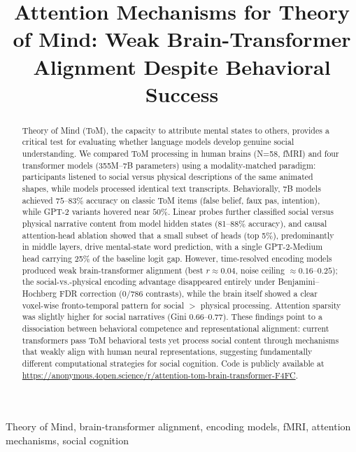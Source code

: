 \documentclass[conference]{IEEEtran}
\begin{document}
\title{Attention Mechanisms for Theory of Mind: Weak Brain-Transformer Alignment Despite Behavioral Success}

\author{
}

\maketitle

\begin{abstract}
Theory of Mind (ToM), the capacity to attribute mental states to others, provides a critical test for evaluating whether language models develop genuine social understanding. We compared ToM processing in human brains (N=58, fMRI) and four transformer models (355M--7B parameters) using a modality-matched paradigm: participants listened to social versus physical descriptions of the same animated shapes, while models processed identical text transcripts. Behaviorally, 7B models achieved $75$--$83\%$ accuracy on classic ToM items (false belief, faux pas, intention), while GPT-2 variants hovered near $50\%$. Linear probes further classified social versus physical narrative content from model hidden states (81--88\% accuracy), and causal attention-head ablation showed that a small subset of heads (top 5\%), predominantly in middle layers, drive mental-state word prediction, with a single GPT-2-Medium head carrying 25\% of the baseline logit gap. However, time-resolved encoding models produced weak brain-transformer alignment (best $r \approx 0.04$, noise ceiling $\approx 0.16$--$0.25$); the social-vs.-physical encoding advantage disappeared entirely under Benjamini--Hochberg FDR correction ($0/786$ contrasts), while the brain itself showed a clear voxel-wise fronto-temporal pattern for social $>$ physical processing. Attention sparsity was slightly higher for social narratives (Gini 0.66--0.77). These findings point to a dissociation between behavioral competence and representational alignment: current transformers pass ToM behavioral tests yet process social content through mechanisms that weakly align with human neural representations, suggesting fundamentally different computational strategies for social cognition. Code is publicly available at \url{https://anonymous.4open.science/r/attention-tom-brain-transformer-F4FC}.
\end{abstract}

\begin{IEEEkeywords}
Theory of Mind, brain-transformer alignment, encoding models, fMRI, attention mechanisms, social cognition
\end{IEEEkeywords}
\end{document}
